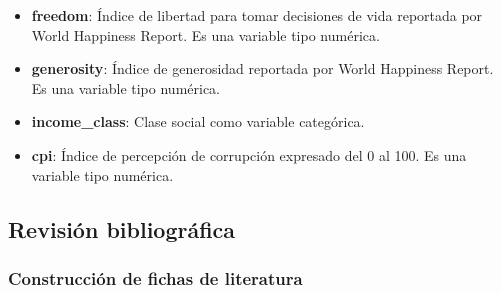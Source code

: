 \begin{itemize}
\begin{itemize}
        \item \textbf{freedom}: Índice de libertad para tomar decisiones de vida reportada por World Happiness Report. Es una variable tipo numérica.
        \item \textbf{generosity}: Índice de generosidad reportada por World Happiness Report. Es una variable tipo numérica.
        \item \textbf{income\_class}: Clase social como variable categórica.
        \item \textbf{cpi}: Índice de percepción de corrupción expresado del 0 al 100. Es una variable tipo numérica.
    \end{itemize}
\end{itemize}

\newpage
\subsection{Revisión bibliográfica}
\subsubsection{Construcción de fichas de literatura}

